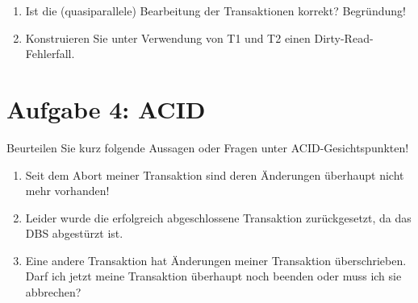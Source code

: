 \documentclass{lehramt-informatik}
\begin{document}
\begin{enumerate}

%

\item Ist die (quasiparallele) Bearbeitung der Transaktionen korrekt?
Begründung!

%

\item Konstruieren Sie unter Verwendung von T1 und T2 einen
Dirty-Read-Fehlerfall.
\end{enumerate}

%

\section{Aufgabe 4: ACID}

Beurteilen Sie kurz folgende Aussagen oder Fragen unter
ACID-Gesichtspunkten!

\begin{enumerate}


\item Seit dem Abort meiner Transaktion sind deren Änderungen überhaupt
nicht mehr vorhanden!


\item Leider wurde die erfolgreich abgeschlossene Transaktion
zurückgesetzt, da das DBS abgestürzt ist.


\item Eine andere Transaktion hat Änderungen meiner Transaktion
überschrieben. Darf ich jetzt meine Transaktion überhaupt noch beenden
oder muss ich sie abbrechen?
\end{enumerate}

%



%


\end{document}
